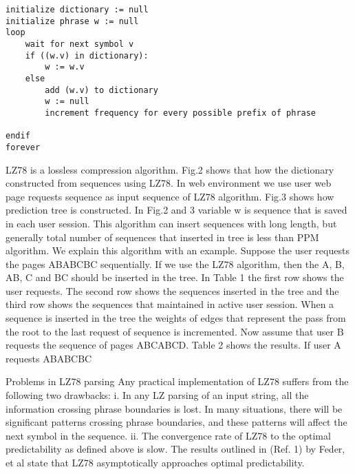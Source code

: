 \begin{verbatim}
initialize dictionary := null 
initialize phrase w := null 
loop
	wait for next symbol v 
	if ((w.v) in dictionary):
		w := w.v 
	else
		add (w.v) to dictionary
		w := null
		increment frequency for every possible prefix of phrase

endif 
forever

\end{verbatim}

LZ78 is a lossless compression algorithm. Fig.2 shows that how the dictionary constructed from sequences using LZ78. In web environment we use user web page requests sequence as input sequence of LZ78 algorithm. Fig.3 shows how prediction tree is constructed. In Fig.2 and 3 variable w is sequence that is saved in each user session. This algorithm can insert sequences with long length, but generally total number of sequences that inserted in tree is less than PPM algorithm. We explain this algorithm with an example. Suppose the user requests the pages ABABCBC sequentially. If we use the LZ78 algorithm, then the A, B, AB, C and BC should be inserted in the tree. In Table 1 the first row shows the user requests. The second row shows the sequences inserted in the tree and the third row shows the sequences that maintained in active user session. When a sequence is inserted in the tree the weights of edges that represent the pass from the root to the last request of sequence is incremented. Now assume that user B requests the sequence of pages ABCABCD. Table 2 shows the results. If user A requests ABABCBC






Problems in LZ78 parsing
Any practical implementation of LZ78 suffers from the following two drawbacks:
i. In any LZ parsing of an input string, all the information crossing phrase boundaries is lost. In many situations, there will be significant patterns crossing phrase boundaries, and these patterns will affect the next symbol in the sequence.
ii. The convergence rate of LZ78 to the optimal predictability as defined above is slow. The results outlined in (Ref. 1) by Feder, et al state that LZ78 asymptotically approaches optimal predictability.


